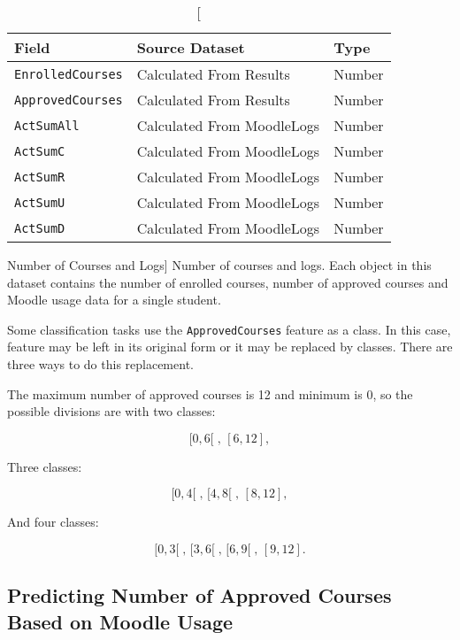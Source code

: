 \begin{table}[h!]
    \centering

    \begin{tabular}{| l | l | l |}
        \hline
        \textbf{Field}           & \textbf{Source Dataset}    & \textbf{Type} \\ \hline
        \texttt{EnrolledCourses} & Calculated From Results    & Number        \\ \hline
        \texttt{ApprovedCourses} & Calculated From Results    & Number        \\ \hline
        \texttt{ActSumAll}       & Calculated From MoodleLogs & Number        \\ \hline
        \texttt{ActSumC}         & Calculated From MoodleLogs & Number        \\ \hline
        \texttt{ActSumR}         & Calculated From MoodleLogs & Number        \\ \hline
        \texttt{ActSumU}         & Calculated From MoodleLogs & Number        \\ \hline
        \texttt{ActSumD}         & Calculated From MoodleLogs & Number        \\ \hline
    \end{tabular}

    \caption
        [Number of Courses and Logs]
        {Number of courses and logs. Each object in this dataset contains the
        number of enrolled courses, number of approved courses and Moodle usage
        data for a single student.}

    \label{tab:dat_002}
\end{table}

Some classification tasks use the \texttt{ApprovedCourses} feature as a class.
In this case, feature may be left in its original form or it may be replaced by
classes. There are three ways to do this replacement.

The maximum number of approved courses is 12 and minimum is 0, so the possible
divisions are with two classes:

\[
    [0, 6[\;,\, [6, 12],
\]

Three classes:

\[
    [0, 4[\;,\, [4, 8[\;,\, [8, 12],
\]

And four classes:

\[
    [0, 3[\;,\, [3, 6[\;,\, [6, 9[\;,\, [9, 12].
\]

\subsection{Predicting Number of Approved Courses Based on Moodle Usage}
\label{sec:exp_003}

